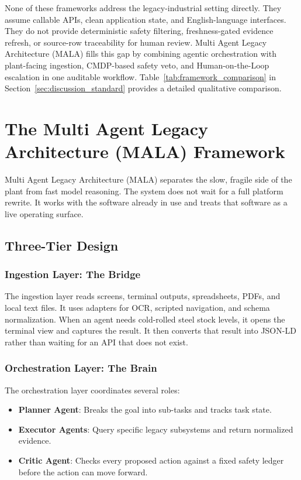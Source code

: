 \documentclass[conference]{IEEEtran}
\newcommand{\MALA}{Multi Agent Legacy Architecture (MALA)}
\begin{document}
None of these frameworks address the legacy-industrial setting directly. They assume callable APIs, clean application state, and English-language interfaces. They do not provide deterministic safety filtering, freshness-gated evidence refresh, or source-row traceability for human review. \MALA{} fills this gap by combining agentic orchestration with plant-facing ingestion, CMDP-based safety veto, and Human-on-the-Loop escalation in one auditable workflow. Table~\ref{tab:framework_comparison} in Section~\ref{sec:discussion_standard} provides a detailed qualitative comparison.


\section{The \MALA{} Framework}\label{sec:mala}

\MALA{} separates the slow, fragile side of the plant from fast model reasoning. The system does not wait for a full platform rewrite. It works with the software already in use and treats that software as a live operating surface.

\subsection{Three-Tier Design}

\subsubsection{Ingestion Layer: The Bridge}
The ingestion layer reads screens, terminal outputs, spreadsheets, PDFs, and local text files. It uses adapters for OCR, scripted navigation, and schema normalization. When an agent needs cold-rolled steel stock levels, it opens the terminal view and captures the result. It then converts that result into JSON-LD rather than waiting for an API that does not exist.

\subsubsection{Orchestration Layer: The Brain}
The orchestration layer coordinates several roles:
\begin{itemize}
  \item \textbf{Planner Agent}: Breaks the goal into sub-tasks and tracks task state.
  \item \textbf{Executor Agents}: Query specific legacy subsystems and return normalized evidence.
  \item \textbf{Critic Agent}: Checks every proposed action against a fixed safety ledger before the action can move forward.
\end{itemize}
\end{document}
